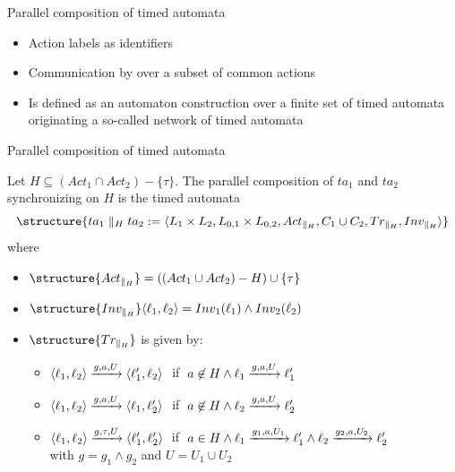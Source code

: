 \documentclass[aspectratio=169]{beamer}
\begin{document}
\begin{slide}{Parallel composition of timed automata}
\small

\begin{itemize}
\item Action labels as  identifiers
\item Communication by  over a subset of common actions
\item  Is defined as an automaton construction over a finite set of
  timed automata originating a so-called \alert{network} of timed
  automata
\end{itemize}

\end{slide}

\begin{slide}{Parallel composition of timed automata}
\small

Let $H \subseteq (Act_1 \cap Act_2) - \{\tau\}$. The parallel composition of $ta_1$ and  $ta_2$ synchronizing on $H$
is the timed automata
\begin{equation*}
\structure{ta_1 \parallel_H ta_2 := \pair{L_1 \times L_2, L_{0,1} \times L_{0,2}, Act_{\parallel_H}, C_1 \cup C_2, Tr_{\parallel_H}, Inv_{\parallel_H}}}
\end{equation*}
where
\begin{itemize}
\item $\structure{Act_{\parallel_H}} = ((Act_1 \cup Act_2) - H) \cup \enset{\tau}$
\item $\structure{Inv_{\parallel_H}} \pair{\ell_1,\ell_2} = Inv_1(\ell_1) \land  Inv_2(\ell_2)$
\item $\structure{Tr_{\parallel_H}}$ is given by:
\begin{itemize}
\item $\langle \ell_1,\ell_2 \rangle \xrightarrow{g,a,U} \langle \ell'_1,\ell_2 \rangle\; $ if $\; a \not \in H \land  \ell_1 \xrightarrow{g,a,U} \ell'_1 $
\item $\langle \ell_1,\ell_2 \rangle \xrightarrow{g,a,U} \langle \ell_1,\ell'_2 \rangle\; $ if $\; a \not \in H \land   \ell_2 \xrightarrow{g,a,U} \ell'_2$
\item $\langle \ell_1,\ell_2 \rangle \xrightarrow{g,\tau,U} \langle \ell'_1,\ell'_2 \rangle\; $ if $\; a \in H \land  \ell_1 \xrightarrow{g_1,a,U_1} \ell'_1 \land \ell_2 \xrightarrow{g_2,a,U_2} \ell'_2$\\
with $g = g_1 \land g_2$ and $U = U_1 \cup U_2$
\end{itemize}
\end{itemize}
\end{slide}
\end{document}
